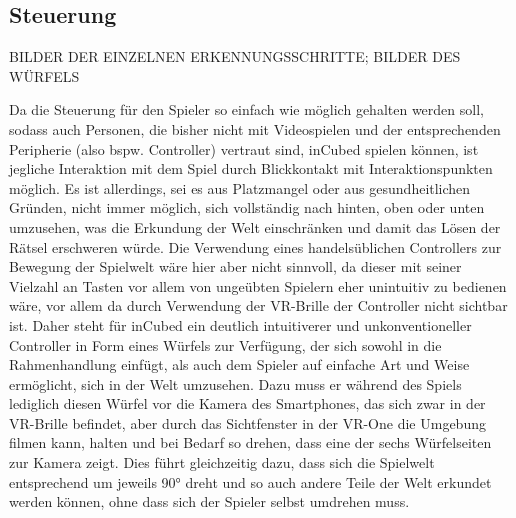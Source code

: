 \subsection{Steuerung}

BILDER DER EINZELNEN ERKENNUNGSSCHRITTE; BILDER DES WÜRFELS

Da die Steuerung für den Spieler so einfach wie möglich gehalten werden soll, sodass auch Personen, die bisher nicht mit Videospielen und der entsprechenden Peripherie (also bspw. Controller) vertraut sind, inCubed spielen können, ist jegliche Interaktion mit dem Spiel durch Blickkontakt mit Interaktionspunkten möglich. Es ist allerdings, sei es aus Platzmangel oder aus gesundheitlichen Gründen, nicht immer möglich, sich vollständig nach hinten, oben oder unten umzusehen, was die Erkundung der Welt einschränken und damit das Lösen der Rätsel erschweren würde. Die Verwendung eines handelsüblichen Controllers zur Bewegung der Spielwelt wäre hier aber nicht sinnvoll, da dieser mit seiner Vielzahl an Tasten vor allem von ungeübten Spielern eher unintuitiv zu bedienen wäre, vor allem da durch Verwendung der VR-Brille der Controller nicht sichtbar ist. Daher steht für inCubed ein deutlich intuitiverer und unkonventioneller Controller in Form eines Würfels zur Verfügung, der sich sowohl in die Rahmenhandlung einfügt, als auch dem Spieler auf einfache Art und Weise ermöglicht, sich in der Welt umzusehen. Dazu muss er während des Spiels lediglich diesen Würfel vor die Kamera des Smartphones, das sich zwar in der VR-Brille befindet, aber durch das Sichtfenster in der VR-One die Umgebung filmen kann, halten und bei Bedarf so drehen, dass eine der sechs Würfelseiten zur Kamera zeigt. Dies führt gleichzeitig dazu, dass sich die Spielwelt entsprechend um jeweils 90° dreht und so auch andere Teile der Welt erkundet werden können, ohne dass sich der Spieler selbst umdrehen muss.

